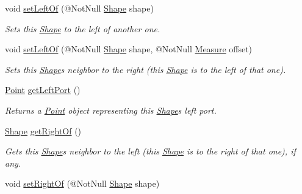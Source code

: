 \begin{DoxyCompactItemize}
void \hyperlink{classcom_1_1aarrelaakso_1_1drawl_1_1_shape_aa9979f6455fea0f9a066365cea3fc9db}{set\+Left\+Of} (@Not\+Null \hyperlink{classcom_1_1aarrelaakso_1_1drawl_1_1_shape}{Shape} shape)
\begin{DoxyCompactList}\small\item\em Sets this \hyperlink{classcom_1_1aarrelaakso_1_1drawl_1_1_shape}{Shape} to the left of another one. \end{DoxyCompactList}\item 
void \hyperlink{classcom_1_1aarrelaakso_1_1drawl_1_1_shape_a185e0377ed1ba3ff4c8c630803f3bfc8}{set\+Left\+Of} (@Not\+Null \hyperlink{classcom_1_1aarrelaakso_1_1drawl_1_1_shape}{Shape} shape, @Not\+Null \hyperlink{classcom_1_1aarrelaakso_1_1drawl_1_1_measure}{Measure} offset)
\begin{DoxyCompactList}\small\item\em Sets this \hyperlink{classcom_1_1aarrelaakso_1_1drawl_1_1_shape}{Shape}\textquotesingle{}s neighbor to the right (this \hyperlink{classcom_1_1aarrelaakso_1_1drawl_1_1_shape}{Shape} is to the left of that one). \end{DoxyCompactList}\item 
\hyperlink{classcom_1_1aarrelaakso_1_1drawl_1_1_point}{Point} \hyperlink{classcom_1_1aarrelaakso_1_1drawl_1_1_shape_aeffa96786ca552adf46924ec77da9555}{get\+Left\+Port} ()
\begin{DoxyCompactList}\small\item\em Returns a \hyperlink{classcom_1_1aarrelaakso_1_1drawl_1_1_point}{Point} object representing this \hyperlink{classcom_1_1aarrelaakso_1_1drawl_1_1_shape}{Shape}\textquotesingle{}s left port. \end{DoxyCompactList}\item 
\hyperlink{classcom_1_1aarrelaakso_1_1drawl_1_1_shape}{Shape} \hyperlink{classcom_1_1aarrelaakso_1_1drawl_1_1_shape_a1ad573b06f341aa79f6a255a476ae6e4}{get\+Right\+Of} ()
\begin{DoxyCompactList}\small\item\em Gets this \hyperlink{classcom_1_1aarrelaakso_1_1drawl_1_1_shape}{Shape}\textquotesingle{}s neighbor to the left (this \hyperlink{classcom_1_1aarrelaakso_1_1drawl_1_1_shape}{Shape} is to the right of that one), if any. \end{DoxyCompactList}\item 
void \hyperlink{classcom_1_1aarrelaakso_1_1drawl_1_1_shape_ae658426065f0d35bd721cd94bc540209}{set\+Right\+Of} (@Not\+Null \hyperlink{classcom_1_1aarrelaakso_1_1drawl_1_1_shape}{Shape} shape)

\end{DoxyCompactItemize}
